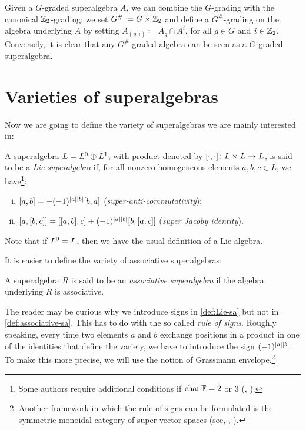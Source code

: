 \label{defi:G-sharp}
Given a $G$-graded superalgebra $A$, we can combine the $G$-grading with the canonical $\mathbb{Z}_2$-grading:
we set $G^\#\coloneqq G\times \mathbb{Z}_2$ and define a $G^\#$-grading on the algebra underlying $A$ by setting $A_{(g,i)} \coloneqq A_g \cap A^i$, for all $g\in G$ and $i\in \mathbb{Z}_2$. 
Conversely, it is clear that any $G^\#$-graded algebra can be seen as a $G$-graded superalgebra. 

\section{Varieties of superalgebras}\label{sec:Grassmann}

Now we are going to define the variety of superalgebras we are mainly interested in:

\begin{defi}\label{def:Lie-sa}
	A superalgebra $L=L^{\bar0}\oplus L^{\bar1}$, with product denoted by $[\cdot, \cdot]\colon L\times L \to L$, is said to be a \emph{Lie superalgebra} if, for all nonzero homogeneous elements $a, b, c \in L$, we have\footnote{Some authors require additional conditions if $\operatorname{char} \mathbb{F} = 2$ or $3$ (\eg, \cite[Subsection 1.2]{MR1192546}).}:
	\begin{enumerate}[(i)]
		\item $[ a, b ] = - (-1)^{|a||b|} [b, a]$ (\emph{super-anti-commutativity});
		\item $[a,[b,c]] = [[a,b],c] + (-1)^{|a||b|} [b, [a,c]]$ (\emph{super Jacoby identity}).
	\end{enumerate}
\end{defi}

Note that if $L^{\bar0} = L$, then we have the usual definition of a Lie algebra. 

It is easier to define the variety of associative superalgebras:

\begin{defi}\label{def:associative-sa}
    A superalgebra $R$ is said to be an \emph{associative superalgebra} if the algebra underlying $R$ is associative. 
\end{defi}

The reader may be curious why we introduce signs in \cref{def:Lie-sa} but not in \cref{def:associative-sa}. 
This has to do with the so called \emph{rule of signs}. 
Roughly speaking, every time two elements $a$ and $b$ exchange positions in a product in one of the identities that define the variety, we have to introduce the sign $(-1)^{|a||b|}$. 
To make this more precise, we will use the notion of Grassmann envelope.\footnote{Another framework in which the rule of signs can be formulated is the symmetric monoidal category of super vector spaces (see, \eg, \cite[Chapter 3]{MR2069561}).} 


